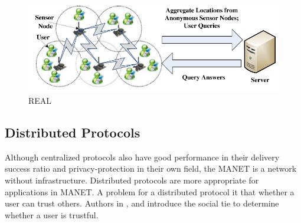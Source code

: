 \begin{figure} [H]
  \centering 
  \includegraphics[width=5.0in]{figures/FIG_REAL_26.png}
  \caption{REAL \cite{C26}} 
  \label{fig:REAL} %
\end{figure}

\subsection{ Distributed Protocols}

\noindent Although centralized protocols also have good performance in their delivery success ratio and privacy-protection in their own field, the MANET is a network without infrastructure. Distributed protocols are more appropriate for applications in MANET. A problem for a distributed protocol it that whether a user can trust others. Authors in \cite{C16}, \cite{C17} and \cite{C18} introduce the social tie to determine whether a user is trustful.

